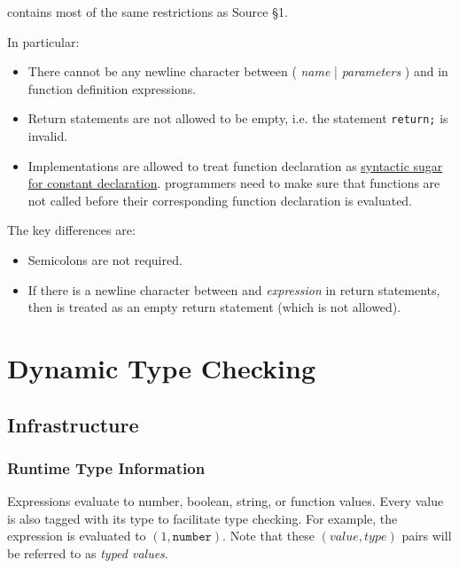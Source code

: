 \DynamicTS{} contains most of the same restrictions as Source \S 1. 

In particular:

\begin{itemize}
    \item There cannot be any newline character between ( \textit{name} | \code{(} \textit{parameters} \code{)} ) and \code{=>} in function
definition expressions.
    \item Return statements are not allowed to be empty, i.e. the statement \verb|return;| is invalid.

    \item Implementations are allowed to treat function declaration as \href{https://source-academy.github.io/sicp/chapters/1.3.2.html#footnote-2}{syntactic sugar for constant declaration}. 
    \DynamicTS{} programmers need to make sure that functions are not called before their corresponding function declaration is evaluated.
\end{itemize}

The key differences are:
\begin{itemize}
    \item Semicolons are not required.
    \item If there is a newline character between  and \textit{expression} in return statements, 
    then  is treated as an empty return statement (which is not allowed).
\end{itemize}



\section{Dynamic Type Checking}

\subsection{Infrastructure}

\subsubsection*{Runtime Type Information}

Expressions evaluate to number, boolean, string, or function values. 
Every value is also tagged with its type to facilitate type checking.
For example, the expression  is evaluated to $(1, \texttt{number})$.
Note that these $(\textit{value}, \textit{type})$ pairs will be referred to as \textit{typed values}.

